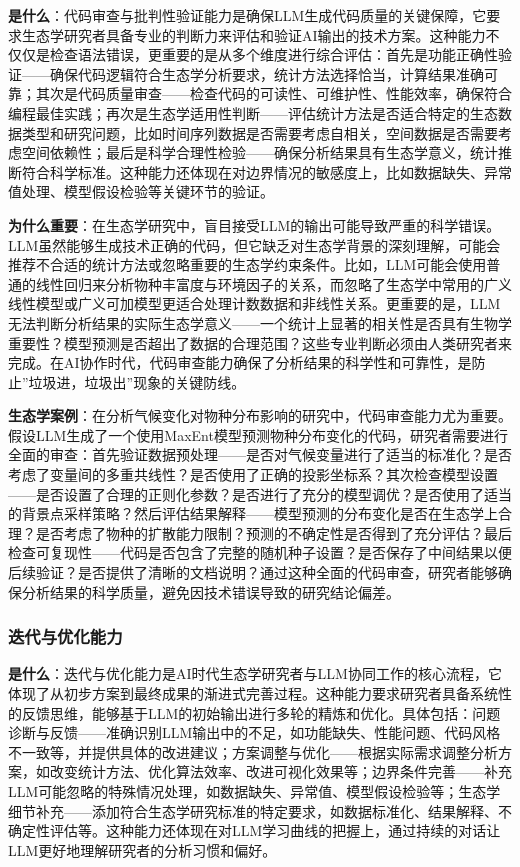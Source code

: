 \documentclass[
]{book}
\begin{document}
\textbf{是什么}：代码审查与批判性验证能力是确保LLM生成代码质量的关键保障，它要求生态学研究者具备专业的判断力来评估和验证AI输出的技术方案。这种能力不仅仅是检查语法错误，更重要的是从多个维度进行综合评估：首先是功能正确性验证------确保代码逻辑符合生态学分析要求，统计方法选择恰当，计算结果准确可靠；其次是代码质量审查------检查代码的可读性、可维护性、性能效率，确保符合编程最佳实践；再次是生态学适用性判断------评估统计方法是否适合特定的生态数据类型和研究问题，比如时间序列数据是否需要考虑自相关，空间数据是否需要考虑空间依赖性；最后是科学合理性检验------确保分析结果具有生态学意义，统计推断符合科学标准。这种能力还体现在对边界情况的敏感度上，比如数据缺失、异常值处理、模型假设检验等关键环节的验证。

\textbf{为什么重要}：在生态学研究中，盲目接受LLM的输出可能导致严重的科学错误。LLM虽然能够生成技术正确的代码，但它缺乏对生态学背景的深刻理解，可能会推荐不合适的统计方法或忽略重要的生态学约束条件。比如，LLM可能会使用普通的线性回归来分析物种丰富度与环境因子的关系，而忽略了生态学中常用的广义线性模型或广义可加模型更适合处理计数数据和非线性关系。更重要的是，LLM无法判断分析结果的实际生态学意义------一个统计上显著的相关性是否具有生物学重要性？模型预测是否超出了数据的合理范围？这些专业判断必须由人类研究者来完成。在AI协作时代，代码审查能力确保了分析结果的科学性和可靠性，是防止''垃圾进，垃圾出''现象的关键防线。

\textbf{生态学案例}：在分析气候变化对物种分布影响的研究中，代码审查能力尤为重要。假设LLM生成了一个使用MaxEnt模型预测物种分布变化的代码，研究者需要进行全面的审查：首先验证数据预处理------是否对气候变量进行了适当的标准化？是否考虑了变量间的多重共线性？是否使用了正确的投影坐标系？其次检查模型设置------是否设置了合理的正则化参数？是否进行了充分的模型调优？是否使用了适当的背景点采样策略？然后评估结果解释------模型预测的分布变化是否在生态学上合理？是否考虑了物种的扩散能力限制？预测的不确定性是否得到了充分评估？最后检查可复现性------代码是否包含了完整的随机种子设置？是否保存了中间结果以便后续验证？是否提供了清晰的文档说明？通过这种全面的代码审查，研究者能够确保分析结果的科学质量，避免因技术错误导致的研究结论偏差。

\hypertarget{ux8fedux4ee3ux4e0eux4f18ux5316ux80fdux529b}{%
\subsubsection{迭代与优化能力}\label{ux8fedux4ee3ux4e0eux4f18ux5316ux80fdux529b}}

\textbf{是什么}：迭代与优化能力是AI时代生态学研究者与LLM协同工作的核心流程，它体现了从初步方案到最终成果的渐进式完善过程。这种能力要求研究者具备系统性的反馈思维，能够基于LLM的初始输出进行多轮的精炼和优化。具体包括：问题诊断与反馈------准确识别LLM输出中的不足，如功能缺失、性能问题、代码风格不一致等，并提供具体的改进建议；方案调整与优化------根据实际需求调整分析方案，如改变统计方法、优化算法效率、改进可视化效果等；边界条件完善------补充LLM可能忽略的特殊情况处理，如数据缺失、异常值、模型假设检验等；生态学细节补充------添加符合生态学研究标准的特定要求，如数据标准化、结果解释、不确定性评估等。这种能力还体现在对LLM学习曲线的把握上，通过持续的对话让LLM更好地理解研究者的分析习惯和偏好。
\end{document}
